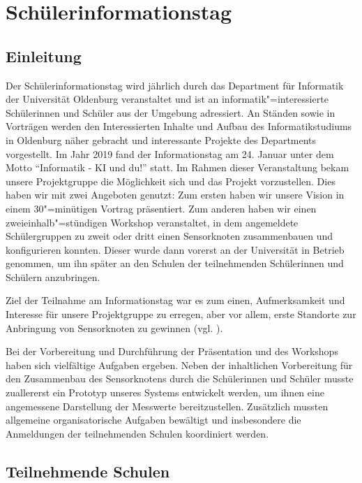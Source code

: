 \chapter{Schülerinformationstag}

\section{Einleitung}

Der Schülerinformationstag wird jährlich durch das Department für Informatik der Universität Oldenburg veranstaltet und ist an informatik"=interessierte Schülerinnen und Schüler aus der Umgebung adressiert.
An Ständen sowie in Vorträgen werden den Interessierten Inhalte und Aufbau des Informatikstudiums in Oldenburg näher gebracht und interessante Projekte des Departments vorgestellt.
Im Jahr 2019 fand der Informationstag am 24. Januar unter dem Motto "`Informatik - KI und du!"' statt.
Im Rahmen dieser Veranstaltung bekam unsere Projektgruppe die Möglichkeit sich und das Projekt vorzustellen.
Dies haben wir mit zwei Angeboten genutzt:
Zum ersten haben wir unsere Vision in einem 30"=minütigen Vortrag präsentiert.
Zum anderen haben wir einen zweieinhalb"=stündigen Workshop veranstaltet, in dem angemeldete Schülergruppen zu zweit oder dritt einen Sensorknoten zusammenbauen und konfigurieren konnten.
Dieser wurde dann vorerst an der Universität in Betrieb genommen, um ihn später an den Schulen der teilnehmenden Schülerinnen und Schülern anzubringen.

Ziel der Teilnahme am Informationstag war es zum einen, Aufmerksamkeit und Interesse für unsere Projektgruppe zu erregen, aber vor allem, erste Standorte zur Anbringung von Sensorknoten zu gewinnen (vgl. ).

Bei der Vorbereitung und Durchführung der Präsentation und des Workshops haben sich vielfältige Aufgaben ergeben.
Neben der inhaltlichen Vorbereitung für den Zusammenbau des Sensorknotens durch die Schülerinnen und Schüler musste zuallererst ein Prototyp unseres Systems entwickelt werden, um ihnen eine angemessene Darstellung der Messwerte bereitzustellen.
Zusätzlich mussten allgemeine organisatorische Aufgaben bewältigt und insbesondere die Anmeldungen der teilnehmenden Schulen koordiniert werden.

\section{Teilnehmende Schulen}

